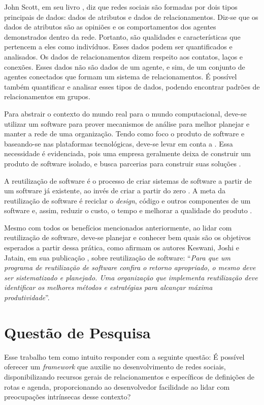 John Scott, em seu livro \cite{Scott:Carrington:2011}, diz que redes sociais são formadas por dois tipos principais de dados: dados de atributos e dados de relacionamentos. Diz-se que os dados de atributos são as opiniões e os comportamentos dos agentes demonstrados dentro da rede. Portanto, são qualidades e características que pertencem a eles como indivíduos. Esses dados podem ser quantificados e analisados. Os dados de relacionamentos dizem respeito aos contatos, laços e conexões. Esses dados não são dados de um agente, e sim, de um conjunto de agentes conectados que formam um sistema de relacionamentos. É possível também quantificar e analisar esses tipos de dados, podendo encontrar padrões de relacionamentos em grupos.

Para abstrair o contexto do mundo real para o mundo computacional, deve-se utilizar um software para prover mecanismos de análise para melhor planejar e manter a rede de uma organização. Tendo como foco o produto de software e baseando-se nas plataformas tecnológicas, deve-se levar em conta a . Essa necessidade é evidenciada, pois uma empresa geralmente deixa de construir um produto de software isolado, e busca parcerias para construir suas soluções \cite{Lima:2015}.

A reutilização de software é o processo de criar sistemas de software a partir de um software já existente, ao invés de criar a partir do zero \cite{Krueger:1992}. A meta da reutilização de software é reciclar o \textit{design}, código e outros componentes de um software e, assim, reduzir o custo, o tempo e melhorar a qualidade do produto \cite{Keswani:Joshi:Jatain:2014}.

Mesmo com todos os benefícios mencionados anteriormente, ao lidar com reutilização de software, deve-se planejar e conhecer bem quais são os objetivos esperados a partir dessa prática, como afirmam os autores Keswani, Joshi e Jatain, em sua publicação  \cite{Keswani:Joshi:Jatain:2014}, sobre reutilização de software: ``\textit{Para que um programa de reutilização de software confira o retorno apropriado, o mesmo deve ser sistematizado e planejado. Uma organização que implementa reutilização deve identificar os melhores métodos e estratégias para alcançar máxima produtividade}''.

\section{Questão de Pesquisa}

Esse trabalho tem como intuito responder com a seguinte questão: É possível oferecer um \textit{framework} que auxilie no desenvolvimento de redes sociais, disponibilizando recursos gerais de relacionamentos e específicos de definições de rotas e agenda, proporcionando ao desenvolvedor facilidade ao lidar com preocupações intrínsecas desse contexto?

